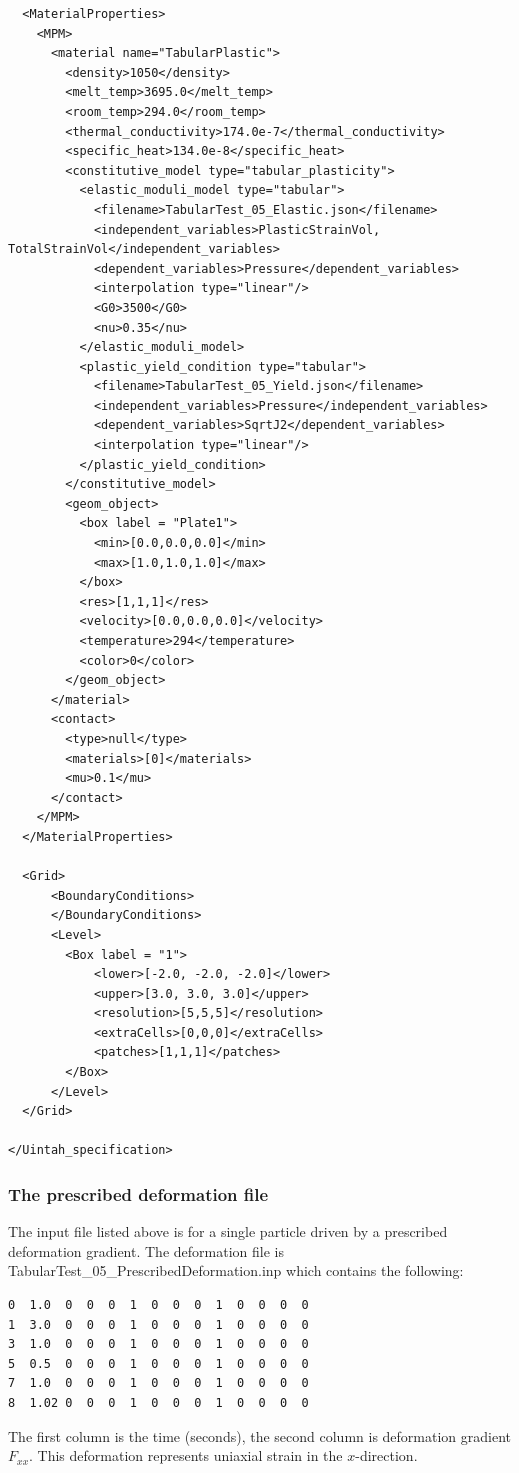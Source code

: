 \begin{lstlisting}
  <MaterialProperties>
    <MPM>
      <material name="TabularPlastic">
        <density>1050</density>
        <melt_temp>3695.0</melt_temp>
        <room_temp>294.0</room_temp>
        <thermal_conductivity>174.0e-7</thermal_conductivity>
        <specific_heat>134.0e-8</specific_heat>
        <constitutive_model type="tabular_plasticity">
          <elastic_moduli_model type="tabular">
            <filename>TabularTest_05_Elastic.json</filename>
            <independent_variables>PlasticStrainVol, TotalStrainVol</independent_variables>
            <dependent_variables>Pressure</dependent_variables>
            <interpolation type="linear"/>
            <G0>3500</G0>
            <nu>0.35</nu>
          </elastic_moduli_model>
          <plastic_yield_condition type="tabular">
            <filename>TabularTest_05_Yield.json</filename>
            <independent_variables>Pressure</independent_variables>
            <dependent_variables>SqrtJ2</dependent_variables>
            <interpolation type="linear"/>
          </plastic_yield_condition>
        </constitutive_model> 
        <geom_object>
          <box label = "Plate1">
            <min>[0.0,0.0,0.0]</min>
            <max>[1.0,1.0,1.0]</max>
          </box>
          <res>[1,1,1]</res>
          <velocity>[0.0,0.0,0.0]</velocity>
          <temperature>294</temperature>
          <color>0</color>
        </geom_object>
      </material>
      <contact>
        <type>null</type>
        <materials>[0]</materials>
        <mu>0.1</mu>
      </contact>
    </MPM>
  </MaterialProperties>

  <Grid>
      <BoundaryConditions>                      
      </BoundaryConditions>
      <Level>
        <Box label = "1">
            <lower>[-2.0, -2.0, -2.0]</lower>
            <upper>[3.0, 3.0, 3.0]</upper>
            <resolution>[5,5,5]</resolution>
            <extraCells>[0,0,0]</extraCells>
            <patches>[1,1,1]</patches>
        </Box>
      </Level>
  </Grid>

</Uintah_specification>
\end{lstlisting}

\subsubsection{The prescribed deformation file}
The input file listed above is for a single particle driven by a prescribed deformation gradient.  The
deformation file is \textsf{TabularTest\_05\_PrescribedDeformation.inp} which contains the following:
\lstset{
  language=XML
}
\begin{lstlisting}
0  1.0  0  0  0  1  0  0  0  1  0  0  0  0
1  3.0  0  0  0  1  0  0  0  1  0  0  0  0  
3  1.0  0  0  0  1  0  0  0  1  0  0  0  0
5  0.5  0  0  0  1  0  0  0  1  0  0  0  0
7  1.0  0  0  0  1  0  0  0  1  0  0  0  0
8  1.02 0  0  0  1  0  0  0  1  0  0  0  0 
\end{lstlisting}
The first column is the time (seconds), the second column is deformation gradient $F_{xx}$.  This
deformation represents uniaxial strain in the $x$-direction.

